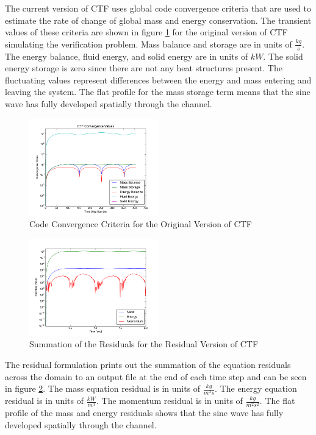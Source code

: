 The current version of CTF uses global code convergence criteria that are
used to estimate the rate of change of global mass and energy conservation. The
transient values of these criteria are shown in figure \ref{fig:Code_Convergence:Original} for the original version of
CTF simulating the verification problem. Mass balance and storage are in units
of $\frac{kg}{s}$. The energy balance, fluid energy, and solid energy are in units of $kW$.
The solid energy storage is zero since there are not any heat structures present. The fluctuating values
represent differences between the energy and mass entering and leaving the
system. The flat profile for the mass storage term means that the sine wave has
fully developed spatially through the channel. 

\begin{figure}[!h]
	\centering
	\includegraphics[width=0.50\textwidth]{images/Code_Verification/run_00_00/original/results/Convergence_Plot.png}
	\caption{Code Convergence Criteria for the Original Version of CTF}
	\label{fig:Code_Convergence:Original}
\end{figure}

\begin{figure}[!h]
	\centering
	\includegraphics[width=0.50\textwidth]{images/Code_Verification/run_00_00/residual/results/Residuals_Plot.png}
	\caption{Summation of the Residuals for the Residual Version of CTF}
	\label{fig:Residuals_Plot}
\end{figure}

The residual formulation prints out the summation of the equation residuals
across the domain to an output file at the end of each time step and can be seen
in figure \ref{fig:Residuals_Plot}. The mass equation residual is in units of
$\frac{kg}{m^{3}s}$. The energy equation residual is in units of
$\frac{kW}{m^{3}}$. The momentum residual is in units of
$\frac{kg}{m^{2}s^{2}}$. The flat profile of the mass and energy residuals shows
that the sine wave has fully developed spatially through the channel.

